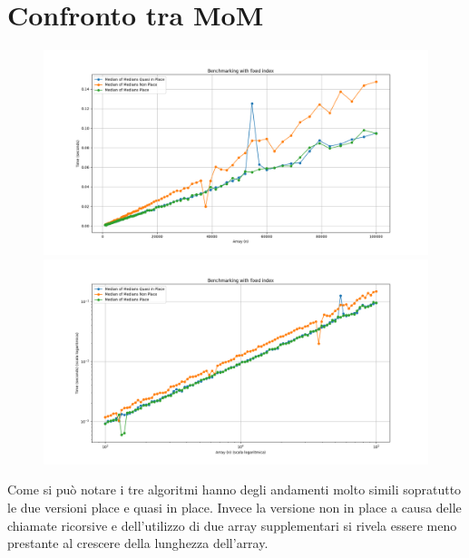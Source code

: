 \documentclass[a4paper]{article}
\begin{document}
\section{Confronto tra MoM}
\begin{figure}[h]
    \centering
    \includegraphics[width=.83\textwidth]{graphs/MoMs_n.png}
    \includegraphics[width=.83\textwidth]{graphs/MoMs_2xlog.png}
\end{figure}
Come si può notare i tre algoritmi hanno degli andamenti molto simili sopratutto le due versioni place e quasi in place. Invece la versione non in place a causa delle chiamate ricorsive e dell'utilizzo di due array supplementari si rivela essere meno prestante al crescere della lunghezza dell'array.\\
\end{document}
